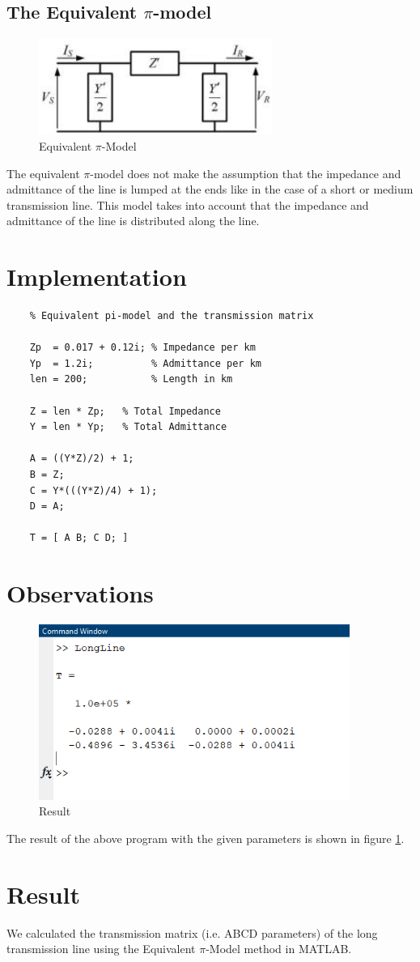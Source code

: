 \documentclass[12pt]{article}
\begin{document}
    \subsection{The Equivalent $\pi$-model}
    \begin{figure}[H]
      \begin{center}
        \includegraphics[width=3in]{img/eqv-pi.png}
        \caption{Equivalent $\pi$-Model}
      \end{center}
    \end{figure}
    The equivalent $\pi$-model does not make the assumption that the 
    impedance and admittance of the line is lumped at the ends like in the
    case of a short or medium transmission line.
    This model takes into account that the impedance and admittance of the line
    is distributed along the line.

  \pagebreak
  \section{Implementation}
  \begin{lstlisting}
    % Equivalent pi-model and the transmission matrix

    Zp  = 0.017 + 0.12i; % Impedance per km
    Yp  = 1.2i;          % Admittance per km
    len = 200;           % Length in km

    Z = len * Zp;   % Total Impedance
    Y = len * Yp;   % Total Admittance

    A = ((Y*Z)/2) + 1;
    B = Z;
    C = Y*(((Y*Z)/4) + 1);
    D = A;

    T = [ A B; C D; ]
  \end{lstlisting}

  \section{Observations}
  \begin{figure}[H]
    \begin{center}
      \includegraphics[width=4in]{img/result.png}
      \caption{Result}
      \label{result}
    \end{center}
  \end{figure}
  The result of the above program with the given parameters 
  is shown in figure \ref{result}.


  \section{Result}
  We calculated the transmission matrix (i.e. ABCD parameters) of the long
  transmission line using the Equivalent $\pi$-Model method in MATLAB.
\end{document}
